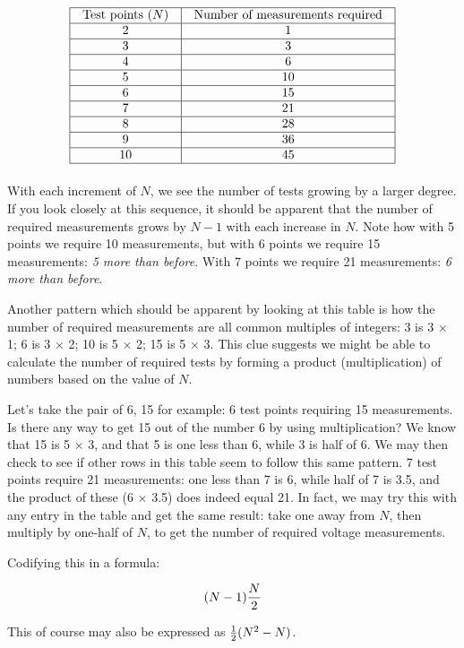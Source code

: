 
$$\vbox{\offinterlineskip
\halign{\strut
\vrule \quad\hfil # \ \hfil & 
\vrule \quad\hfil # \ \hfil \vrule \cr
\noalign{\hrule}
%
Test points ($N$) & Number of measurements required \cr
%
\noalign{\hrule}
%
2 & 1 \cr
%
\noalign{\hrule}
%
3 & 3 \cr
%
\noalign{\hrule}
%
4 & 6 \cr
%
\noalign{\hrule}
%
5 & 10 \cr
%
\noalign{\hrule}
%
6 & 15 \cr
%
\noalign{\hrule}
%
7 & 21 \cr
%
\noalign{\hrule}
%
8 & 28 \cr
%
\noalign{\hrule}
%
9 & 36 \cr
%
\noalign{\hrule}
%
10 & 45 \cr
%
\noalign{\hrule}
} %
}$$ %

With each increment of $N$, we see the number of tests growing by a larger degree.  If you look closely at this sequence, it should be apparent that the number of required measurements grows by $N-1$ with each increase in $N$.  Note how with 5 points we require 10 measurements, but with 6 points we require 15 measurements: {\it 5 more than before}.  With 7 points we require 21 measurements: {\it 6 more than before}.

Another pattern which should be apparent by looking at this table is how the number of required measurements are all common multiples of integers: 3 is 3 $\times$ 1; 6 is 3 $\times$ 2; 10 is 5 $\times$ 2; 15 is 5 $\times$ 3.  This clue suggests we might be able to calculate the number of required tests by forming a product (multiplication) of numbers based on the value of $N$.

Let's take the pair of 6, 15 for example: 6 test points requiring 15 measurements.  Is there any way to get 15 out of the number 6 by using multiplication?  We know that 15 is 5 $\times$ 3, and that 5 is one less than 6, while 3 is half of 6.  We may then check to see if other rows in this table seem to follow this same pattern.  7 test points require 21 measurements: one less than 7 is 6, while half of 7 is 3.5, and the product of these (6 $\times$ 3.5) does indeed equal 21.  In fact, we may try this with any entry in the table and get the same result: take one away from $N$, then multiply by one-half of $N$, to get the number of required voltage measurements.

Codifying this in a formula:

$$(N-1){N \over 2}$$

This of course may also be expressed as ${1 \over 2}(N^2 - N)$.



